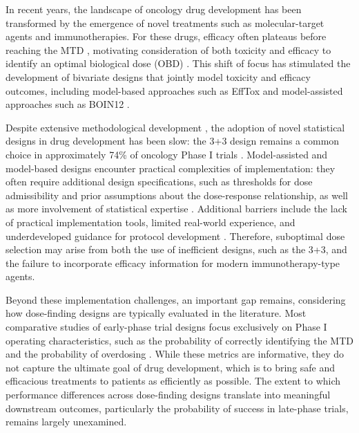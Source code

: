 \documentclass[11pt]{article}
\begin{document}
In recent years, the landscape of oncology drug development has been transformed by the emergence of novel treatments such as molecular-target agents and immunotherapies. For these drugs, efficacy often plateaus before reaching the MTD \parencite{agrawal_nivolumab_2016,bekaii-saab_regorafenib_2019,fujimoto_phase_2017}, motivating consideration of both toxicity and efficacy to identify an optimal biological dose (OBD) \parencite{MTD_OBD, OBD_clinical_efficacy}. This shift of focus has stimulated the development of bivariate designs that jointly model toxicity and efficacy outcomes, including model-based approaches such as EffTox and model-assisted approaches such as BOIN12 \parencite{BOIN12,EffTox}. 

Despite extensive methodological development \parencite{kessels2026knowledge}, the adoption of novel statistical designs in drug development has been slow: the 3+3 design remains a common choice in approximately 74\% of oncology Phase I trials \parencite{review_phase1}. Model-assisted and model-based designs encounter practical complexities of implementation: they often require additional design specifications, such as thresholds for dose admissibility and prior assumptions about the dose-response relationship, as well as more involvement of statistical expertise \parencite{clertant2022early}. Additional barriers include the lack of practical implementation tools, limited real-world experience, and underdeveloped guidance for protocol development \parencite{petroni2017implementation}. Therefore, suboptimal dose selection may arise from both the use of inefficient designs, such as the 3+3, and the failure to incorporate efficacy information for modern immunotherapy-type agents. 

Beyond these implementation challenges, an important gap remains, considering how dose-finding designs are typically evaluated in the literature. Most comparative studies of early-phase trial designs focus exclusively on Phase I operating characteristics, such as the probability of correctly identifying the MTD and the probability of overdosing \parencite{horton2017performance,iasonos2008comprehensive,van2016performance,zhou2018comparative}. While these metrics are informative, they do not capture the ultimate goal of drug development, which is to bring safe and efficacious treatments to patients as efficiently as possible. The extent to which performance differences across dose-finding designs translate into meaningful downstream outcomes, particularly the probability of success in late-phase trials, remains largely unexamined.
\end{document}
